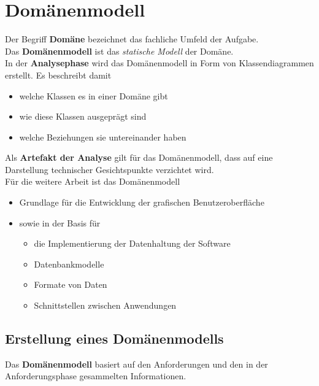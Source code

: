 \section{Domänenmodell}

\noindent
Der Begriff \textbf{Domäne} bezeichnet das fachliche Umfeld der Aufgabe.\\

\noindent
Das \textbf{Domänenmodell} ist das \textit{statische Modell} der Domäne.\\

\noindent
In der \textbf{Analysephase} wird das Domänenmodell in Form von Klassendiagrammen erstellt.
Es beschreibt damit


\begin{itemize}
    \item welche Klassen es in einer Domäne gibt
    \item wie diese Klassen ausgeprägt sind
    \item welche Beziehungen sie untereinander haben
\end{itemize}

\noindent
Als \textbf{Artefakt der Analyse} gilt für das Domänenmodell, dass auf eine Darstellung technischer Gesichtspunkte verzichtet wird.\\

\noindent
Für die weitere Arbeit ist das Domänenmodell

\begin{itemize}
    \item Grundlage für die Entwicklung der grafischen Benutzeroberfläche
    \item sowie in der  Basis für
        \begin{itemize}
            \item die Implementierung der Datenhaltung der Software
            \item Datenbankmodelle
            \item Formate von Daten
            \item Schnittstellen zwischen Anwendungen
        \end{itemize}
\end{itemize}

\subsection{Erstellung eines Domänenmodells}
Das \textbf{Domänenmodell} basiert auf den Anforderungen und den in der Anforderungsphase gesammelten Informationen.\\

